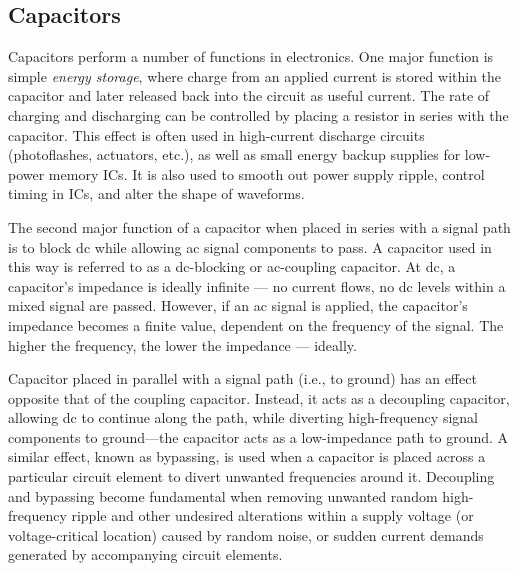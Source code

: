 \documentclass[../../document]{subfiles}
\begin{document}
\subsection{Capacitors}
Capacitors perform a number of functions in electronics. One major function is
simple \emph{energy storage}, where charge from an applied current is stored
within the capacitor and later released back into the circuit as useful
current. The rate of charging and discharging can be controlled by placing a
resistor in series with the capacitor. This effect is often used in
high-current discharge circuits (photoflashes, actuators, etc.), as well as
small energy backup supplies for low-power memory ICs. It is also used to
smooth out power supply ripple, control timing in ICs, and alter the shape of
waveforms. \cite{practical_electronics}

The second major function of a capacitor when placed in series with a signal
path is to block dc while allowing ac signal components to pass. A capacitor
used in this way is referred to as a dc-blocking or ac-coupling capacitor. At
dc, a capacitor’s impedance is ideally infinite --- no current flows, no dc
levels within a mixed signal are passed. However, if an ac signal is applied,
the capacitor’s impedance becomes a finite value, dependent on the frequency of
the signal. The higher the frequency, the lower the impedance --- ideally.
\cite{practical_electronics}

Capacitor placed in parallel with a signal path (i.e., to ground) has an effect
opposite that of the coupling capacitor. Instead, it acts as a decoupling
capacitor, allowing dc to continue along the path, while diverting
high-frequency signal components to ground—the capacitor acts as a
low-impedance path to ground. A similar effect, known as bypassing, is used
when a capacitor is placed across a particular circuit element to divert
unwanted frequencies around it. Decoupling and bypassing become fundamental
when removing unwanted random high-frequency ripple and other undesired
alterations within a supply voltage (or voltage-critical location) caused by
random noise, or sudden current demands generated by accompanying circuit
elements. \cite{practical_electronics}
\end{document}
